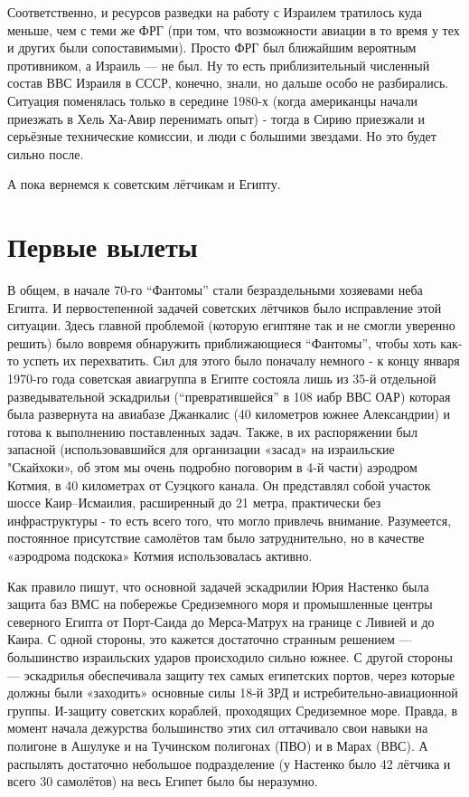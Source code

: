 Соответственно, и ресурсов разведки на работу с Израилем тратилось куда меньше, чем с теми же ФРГ (при том, что возможности авиации в то время у тех и других были сопоставимыми). Просто ФРГ был ближайшим вероятным противником, а Израиль — не был. Ну то есть приблизительный численный состав ВВС Израиля в СССР, конечно, знали, но дальше особо не разбирались. Ситуация поменялась только в середине 1980-х (когда американцы начали приезжать в Хель Ха-Авир перенимать опыт) - тогда в Сирию приезжали и серьёзные технические комиссии, и люди с большими звездами. Но это будет сильно после.

А пока вернемся к советским лётчикам и Египту.

\section{Первые вылеты}

В общем, в начале 70-го “Фантомы” стали безраздельными хозяевами неба Египта. И первостепенной задачей советских лётчиков было исправление этой ситуации. Здесь главной проблемой (которую египтяне так и не смогли уверенно решить) было вовремя обнаружить приближающиеся “Фантомы”, чтобы хоть как-то успеть их перехватить. Сил для этого было поначалу немного - к концу января 1970-го года советская авиагруппа в Египте состояла лишь из 35-й отдельной разведывательной эскадрильи (“превратившейся” в 108 иабр ВВС ОАР) которая была развернута на авиабазе Джанкалис (40 километров южнее Александрии) и готова к выполнению поставленных задач. Также, в их распоряжении был запасной (использовавшийся для организации «засад» на израильские "Скайхоки», об этом мы очень подробно поговорим в 4-й части) аэродром Котмия, в 40 километрах от Суэцкого канала. Он представлял собой участок шоссе Каир–Исмаилия, расширенный до 21 метра, практически без инфраструктуры - то есть всего того, что могло привлечь внимание. Разумеется, постоянное присутствие самолётов там было затруднительно, но в качестве «аэродрома подскока» Котмия использовалась активно.

Как правило пишут, что основной задачей эскадрилии Юрия Настенко была защита баз ВМС на побережье Средиземного моря и промышленные центры северного Египта от Порт-Саида до Мерса-Матрух на границе с Ливией и до Каира. С одной стороны, это кажется достаточно странным решением — большинство израильских ударов происходило сильно южнее. С другой стороны — эскадрилья обеспечивала защиту тех самых египетских портов, через которые должны были «заходить» основные силы 18-й ЗРД и истребительно-авиационной группы. И-защиту советских кораблей, проходящих Средиземное море. Правда, в момент начала дежурства большинство этих сил оттачивало свои навыки на полигоне в Ашулуке и на Тучинском полигонах (ПВО) и в Марах (ВВС). А распылять достаточно небольшое подразделение (у Настенко было 42 лётчика и всего 30 самолётов) на весь Египет было бы неразумно.

